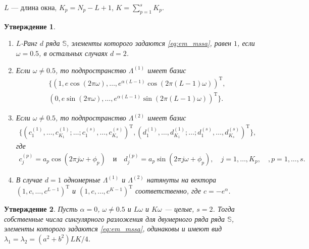 \documentclass[specialist,
               substylefile = spbu.rtx,
               subf,href,colorlinks=true, 12pt]{disser}
\newtheorem{Th}{Утверждение}
\begin{document}
$L$ --- длина окна, $K_p = N_p - L + 1$, $K = \sum_{p=1}^{s} K_p$.


\begin{Th}  \cite[Предложение 2.2]{Golyandina.etal2003} \label{th:mssa_num} \label{th:mssa_vec}
\begin{enumerate}
\item 
$L$-Ранг $d$ ряда $\mathbb{S}$, элементы которого задаются \eqref{eq:em_mssa}, равен $1$, если $\omega = 0.5$, в остальных случаях $d=2$.
\item Если $\omega \not = 0.5$, то подпространство $\Lambda^{(1)}$ имеет базис 
\begin{gather*}
\{(1, e\cos(2\pi\omega),\ldots,e^{\alpha (L-1)}\cos(2\pi (L-1) \omega))^\mathrm{T}, \\
(0, e\sin(2\pi\omega),\ldots,e^{\alpha (L-1)}\sin(2\pi (L-1) \omega))^\mathrm{T}\}. 
\end{gather*}
\item Если $\omega \not = 0.5$, то подпространство $\Lambda^{(2)}$ имеет базис 
\begin{gather*}
\{(c^{(1)}_1,\ldots,c_{K_1}^{(1)}; \ldots; c^{(s)}_1,\ldots,c_{K_s}^{(s)})^\mathrm{T},
(d^{(1)}_1,\ldots,d_{K_1}^{(1)}; \ldots; d^{(s)}_1,\ldots,d_{K_s}^{(s)})^\mathrm{T} \}, 
\end{gather*}
где 
\begin{gather*}
c^{(p)}_j = a_p \cos(2\pi j \omega + \phi_p) \quad \text{и}\quad d^{(p)}_j = a_p \sin(2\pi j \omega + \phi_p), \quad j=1,\ldots,K_p, \quad, p=1,\ldots,s.
\end{gather*}
\item В случае $d=1$ одномерные $\Lambda^{(1)}$ и $\Lambda^{(2)}$ натянуты на вектора \\ $(1,c,\ldots,c^{L-1})^{\mathrm{T}}$ и $(1,c,\ldots,c^{K-1})^{\mathrm{T}}$ соответственно, где $c = -e^{\alpha}$.
\end{enumerate}
\end{Th}

\begin{Th} \cite[Предложение 2.3]{Golyandina.etal2003} \label{th:mssa_num}
Пусть $\alpha = 0$, $\omega \not = 0.5$ и $L\omega$  и $K\omega$ --- целые, $s=2$. Тогда собственные числа сингулярного разложения для двумерного ряда ряда $\mathbb{S}$, элементы которого задаются \eqref{eq:em_mssa}, одинаковы и имеют вид $\lambda_1=\lambda_2=(a^2 + b^2)LK/4$.
\end{Th}
\end{document}
